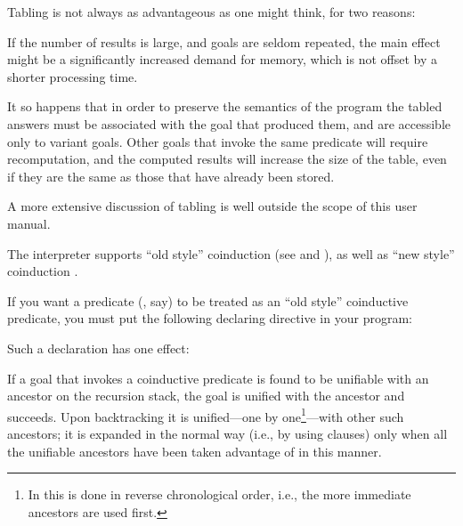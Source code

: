 Tabling is not always as advantageous as one might think, for two reasons:
  \begin{Enumerate}
  \item
    If the number of results is large, and goals are seldom repeated, the
    main effect might be a significantly increased demand for memory, which
    is not offset by a shorter processing time.

  \item It so happens that in order to preserve the semantics of the program
    the tabled answers must be associated with the goal that produced them,
    and are accessible only to variant goals.  Other goals that invoke the
    same predicate will require recomputation, and the computed results will
    increase the size of the table, even if they are the same as those that
    have already been stored.
  \end{Enumerate}


A more extensive discussion of tabling is well outside the scope of this user
manual.



%
%

The interpreter supports ``old style'' coinduction (see \cite{coinductive}
and \cite{co-LP}), as well as ``new style'' coinduction
\cite{gupta-coinductive-personal}.

If you want a predicate (, say) to be treated as an ``old style''
coinductive predicate, you must put the following declaring directive in your
program:\\
\ind{}%
\label{dir:coinductive2}

Such a declaration has one effect:
\begin{Itemize}
  \item
    If a goal that invokes a coinductive predicate is found to be unifiable
    with an ancestor on the recursion stack, the goal is unified with the
    ancestor and succeeds.  Upon backtracking it is unified---one by
    one\footnote{
      In  this is done in reverse chronological order, i.e.,
      the more immediate ancestors are used first.
    }---with other such ancestors;
    it is expanded in the normal way (i.e., by
    using clauses) only when all the unifiable ancestors have been taken
    advantage of in this manner.
\end{Itemize}


